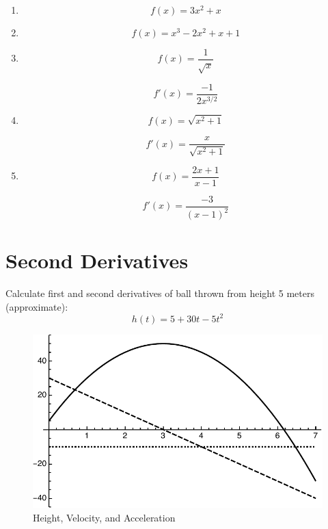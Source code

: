 \documentclass[letterpaper, landscape]{exam}
\begin{document}
  \begin{enumerate}
    \item 
      \[
        f(x) = 3x^2 + x
      \]
    \item 
      \[
        f(x) = x^3 - 2x^2 + x + 1
      \]

    \item 
      \[
        f(x) = \frac{1}{\sqrt{x}}
      \]

      \begin{solution}
        \[
          f'(x) = \frac{-1}{2 x^{3/2}}
        \]
      \end{solution}

    \item 
      \[
        f(x) = \sqrt{x^2 + 1}
      \]

      \begin{solution}
        \[
          f'(x) = \frac{x}{\sqrt{x^2 + 1}}
        \]
      \end{solution}

    \item 
      \[
        f(x) = \frac{2x + 1}{x - 1}
      \]

      \begin{solution}
        \[
          f'(x) = \frac{-3}{(x - 1)^2}
        \]
      \end{solution}

  \end{enumerate}

  \section{Second Derivatives}


  Calculate first and second derivatives of ball thrown from height 5 meters (approximate):
  \[
    h(t) = 5 + 30t - 5t^2
  \]

  \begin{figure}[H]
    \centering
    \includegraphics[scale = 0.5]{example07.pdf}
    \caption{Height, Velocity, and Acceleration}
    \label{fig:example07}
  \end{figure}
\end{document}
